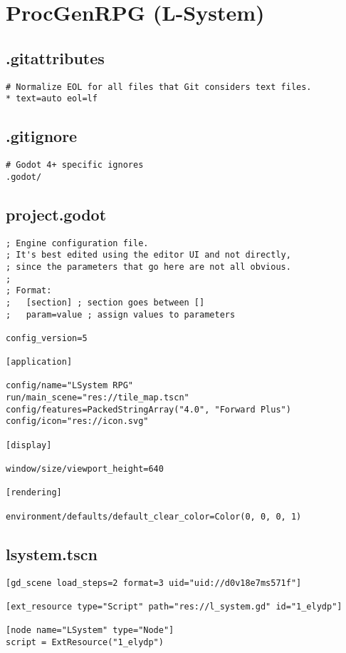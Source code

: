 \section{ProcGenRPG (L-System)}

\subsection{.gitattributes}

\begin{lstlisting}
# Normalize EOL for all files that Git considers text files.
* text=auto eol=lf
\end{lstlisting}

\subsection{.gitignore}

\begin{lstlisting}
# Godot 4+ specific ignores
.godot/
\end{lstlisting}

\subsection{project.godot}

\begin{lstlisting}
; Engine configuration file.
; It's best edited using the editor UI and not directly,
; since the parameters that go here are not all obvious.
;
; Format:
;   [section] ; section goes between []
;   param=value ; assign values to parameters

config_version=5

[application]

config/name="LSystem RPG"
run/main_scene="res://tile_map.tscn"
config/features=PackedStringArray("4.0", "Forward Plus")
config/icon="res://icon.svg"

[display]

window/size/viewport_height=640

[rendering]

environment/defaults/default_clear_color=Color(0, 0, 0, 1)
\end{lstlisting}

\subsection{l\textunderscore{}system.tscn}

\begin{lstlisting}
[gd_scene load_steps=2 format=3 uid="uid://d0v18e7ms571f"]

[ext_resource type="Script" path="res://l_system.gd" id="1_elydp"]

[node name="LSystem" type="Node"]
script = ExtResource("1_elydp")
\end{lstlisting}

